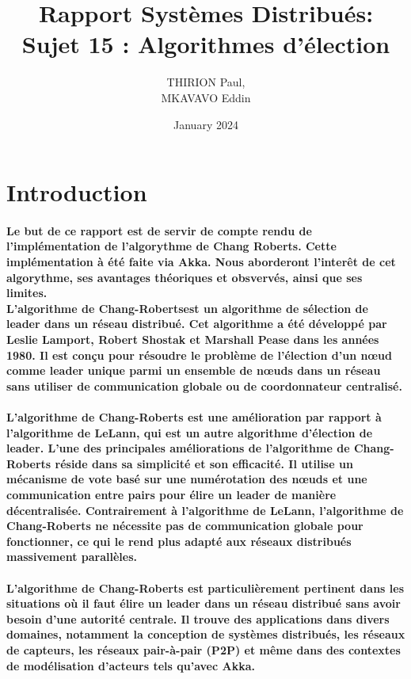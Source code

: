 \documentclass[12pt]{article}
\title{Rapport Systèmes Distribués:\\Sujet 15 : Algorithmes d’élection}
\author{THIRION Paul,\\ MKAVAVO Eddin  }
\date{January 2024}
\begin{document}
\maketitle

\newpage
\section{Introduction}
\paragraph{Le but de ce rapport est de servir de compte rendu de l'implémentation de l'algorythme de Chang Roberts. Cette implémentation à été faite via Akka. Nous aborderont l'interêt de cet algorythme, ses avantages théoriques et obsvervés, ainsi que ses limites. \\L'algorithme de Chang-Robertsest un algorithme de sélection de leader dans un réseau distribué. Cet algorithme a été développé par Leslie Lamport, Robert Shostak et Marshall Pease dans les années 1980. Il est conçu pour résoudre le problème de l'élection d'un nœud comme leader unique parmi un ensemble de nœuds dans un réseau sans utiliser de communication globale ou de coordonnateur centralisé.}
\paragraph{L'algorithme de Chang-Roberts est une amélioration par rapport à l'algorithme de LeLann, qui est un autre algorithme d'élection de leader. L'une des principales améliorations de l'algorithme de Chang-Roberts réside dans sa simplicité et son efficacité. Il utilise un mécanisme de vote basé sur une numérotation des nœuds et une communication entre pairs pour élire un leader de manière décentralisée. Contrairement à l'algorithme de LeLann, l'algorithme de Chang-Roberts ne nécessite pas de communication globale pour fonctionner, ce qui le rend plus adapté aux réseaux distribués massivement parallèles.}
\paragraph{L'algorithme de Chang-Roberts est particulièrement pertinent dans les situations où il faut élire un leader dans un réseau distribué sans avoir besoin d'une autorité centrale. Il trouve des applications dans divers domaines, notamment la conception de systèmes distribués, les réseaux de capteurs, les réseaux pair-à-pair (P2P) et même dans des contextes de modélisation d'acteurs tels qu'avec Akka.}
\end{document}
